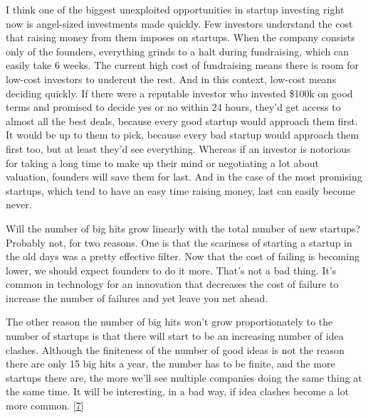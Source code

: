 I think one of the biggest
                  unexploited opportunities in startup investing right now is
                  angel-sized investments made quickly. Few investors understand
                  the cost that raising money from them imposes on startups.
                  When the company consists only of the founders, everything
                  grinds to a halt during fundraising, which can easily take 6
                  weeks. The current high cost of fundraising means there is
                  room for low-cost investors to undercut the rest. And in this
                  context, low-cost means deciding quickly. If there were a
                  reputable investor who invested \$100k on good terms and
                  promised to decide yes or no within 24 hours, they'd get
                  access to almost all the best deals, because every good
                  startup would approach them first. It would be up to them to
                  pick, because every bad startup would approach them first too,
                  but at least they'd see everything. Whereas if an investor is
                  notorious for taking a long time to make up their mind or
                  negotiating a lot about valuation, founders will save them for
                  last. And in the case of the most promising startups, which
                  tend to have an easy time raising money, last can easily
                  become never.

Will the number of big hits grow
                  linearly with the total number of new startups? Probably not,
                  for two reasons. One is that the scariness of starting a
                  startup in the old days was a pretty effective filter. Now
                  that the cost of failing is becoming lower, we should expect
                  founders to do it more. That's not a bad thing. It's common in
                  technology for an innovation that decreases the cost of
                  failure to increase the number of failures and yet leave you
                  net ahead.

The other reason the number of big hits
                  won't grow proportionately to the number of startups is that
                  there will start to be an increasing number of idea clashes.
                  Although the finiteness of the number of good ideas is not the
                  reason there are only 15 big hits a year, the number has to be
                  finite, and the more startups there are, the more we'll see
                  multiple companies doing the same thing at the same time. It
                  will be interesting, in a bad way, if idea clashes become a
                  lot more common.
                  [\href{\#f7n}{7}]

